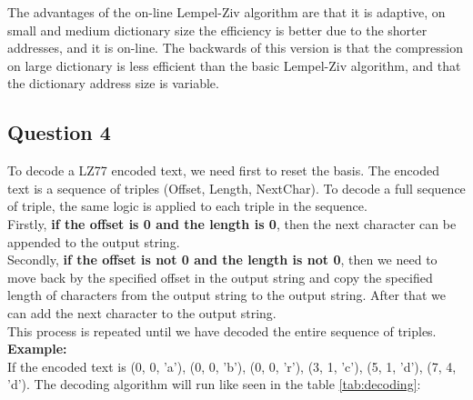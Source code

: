 \documentclass[]{template}
\begin{document}
    \noindent
    The advantages of the on-line Lempel-Ziv algorithm are that it is adaptive, on small and medium dictionary size the efficiency is better due to the shorter addresses, and it is on-line. The backwards of this version is that the compression
    on large dictionary is less efficient than the basic Lempel-Ziv algorithm, and that the dictionary address size is variable.\\

    \subsection{Question 4}

    To decode a LZ77 encoded text, we need first to reset the basis. The encoded text is a 
    sequence of triples (Offset, Length, NextChar). 
    To decode a full sequence of triple, the same logic is applied to each triple in the sequence.\\

    \noindent
    Firstly, \textbf{if the offset is 0 and the length is 0}, then the next
    character can be appended to the output string.\\

    \noindent
    Secondly, \textbf{if the offset is not 0 and the length is not 0}, then we 
    need to move back by the specified offset in the output string and copy 
    the specified length of characters from the output string to the output string.
    After that we can add the next character to the output string.\\

    \noindent
    This process is repeated until we have decoded the entire sequence of triples.\\

    \noindent
    \textbf{Example:}\\
    \noindent
    If the encoded text is (0, 0, 'a'),
    (0, 0, 'b'),
    (0, 0, 'r'),
    (3, 1, 'c'),
    (5, 1, 'd'),
    (7, 4, 'd'). The decoding algorithm will run like seen in the table \ref{tab:decoding}: 
\end{document}

